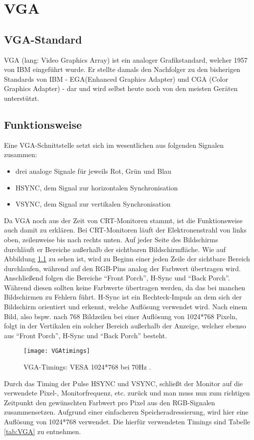 \chapter{VGA}
\label{cha:VGA}


\section{VGA-Standard}
VGA (lang: Video Graphics Array) ist ein analoger Grafikstandard, welcher 1957 von IBM eingeführt wurde. Er stellte damals den Nachfolger zu den bisherigen Standards von IBM - EGA(Enhanced Graphics Adapter) und CGA (Color Graphics Adapter) - dar und wird selbst heute noch von den meisten Geräten unterstützt.

\section{Funktionsweise}
Eine VGA-Schnittstelle setzt sich im wesentlichen aus folgenden Signalen zusammen:\begin{itemize}
\item drei analoge Signale für jeweils Rot, Grün und Blau
\item HSYNC, dem Signal zur horizontalen Synchronisation
\item VSYNC, dem Signal zur vertikalen Synchronisation
\end{itemize}
Da VGA noch aus der Zeit von CRT-Monitoren stammt, ist die Funktionsweise auch damit zu erklären. Bei CRT-Monitoren läuft der Elektronenstrahl von links oben, zeilenweise bis nach rechts unten. Auf jeder Seite des Bildschirms durchläuft er Bereiche außerhalb der sichtbaren Bildschirmfläche. Wie auf Abbildung \ref{fig:VGA-T} zu sehen ist, wird zu Beginn einer jeden Zeile der sichtbare Bereich durchlaufen, während auf den RGB-Pins analog der Farbwert übertragen wird. Anschließend folgen die Bereiche "`Front Porch"', H-Sync und "`Back Porch"'. Während diesen sollten keine Farbwerte übertragen werden, da das bei manchen Bildschirmen zu Fehlern führt. H-Sync ist ein Rechteck-Impuls an dem sich der Bildschirm orientiert und erkennt, welche Auflösung verwendet wird. Nach einem Bild, also bspw. nach 768 Bildzeilen bei einer Auflösung von 1024*768 Pixeln, folgt in der Vertikalen ein solcher Bereich außerhalb der Anzeige, welcher ebenso aus "`Front Porch"', H-Sync und "`Back Porch"' besteht.
%
\begin{figure}
\centering
\texttt{[image: VGAtimings]} %
\caption{VGA-Timings: VESA 1024*768 bei 70Hz \cite{VGAT}.}
\label{fig:VGA-T}
\end{figure}
\FloatBarrier
%
Durch das Timing der Pulse HSYNC und VSYNC, schließt der Monitor auf die verwendete Pixel-, Monitorfrequenz, etc. zurück und man muss nun zum richtigen Zeitpunkt den gewünschten Farbwert pro Pixel aus den RGB-Signalen zusammensetzen. Aufgrund einer einfacheren Speicheradressierung, wird hier eine Auflösung von 1024*768 verwendet. Die hierfür verwendeten Timings sind Tabelle \ref{tab:VGA} zu entnehmen.
%

